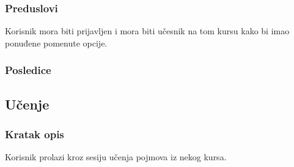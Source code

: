 \subsubsection{Preduslovi}
Korisnik mora biti prijavljen i mora biti učesnik na tom kursu kako bi imao ponuđene pomenute opcije.
\subsubsection{Posledice}



\subsection{Učenje}
\label{subsec:ucenje}

\subsubsection{Kratak opis}
Korisnik prolazi kroz sesiju učenja pojmova iz nekog kursa.

